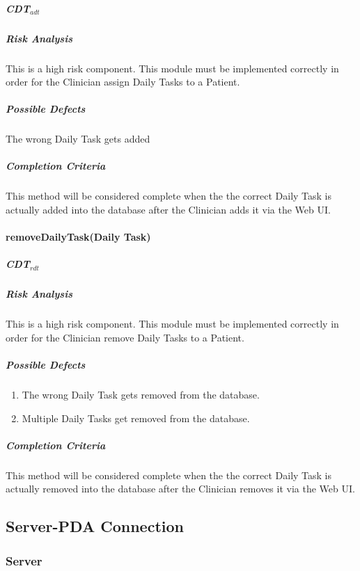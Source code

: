 \documentclass{article}
\begin{document}
\subparagraph{CDT$_{adt}$}

\subparagraph{Risk Analysis}
This is a high risk component. This module must be implemented correctly in order for the Clinician assign Daily Tasks to a Patient.

\subparagraph{Possible Defects}
The wrong Daily Task gets added

\subparagraph{Completion Criteria}
This method will be considered complete when the the correct Daily Task is actually added into the database after the Clinician adds it via the Web UI.

\paragraph{removeDailyTask(Daily Task)}

\subparagraph{CDT$_{rdt}$}

\subparagraph{Risk Analysis}
This is a high risk component. This module must be implemented correctly in order for the Clinician remove Daily Tasks to a Patient.

\subparagraph{Possible Defects}
\begin{enumerate}
\item The wrong Daily Task gets removed from the database.
\item Multiple Daily Tasks get removed from the database. 
\end{enumerate}

\subparagraph{Completion Criteria}
This method will be considered complete when the the correct Daily Task is actually removed into the database after the Clinician removes it via the Web UI.


\subsection{Server-PDA Connection}

\subsubsection{Server}
\end{document}
